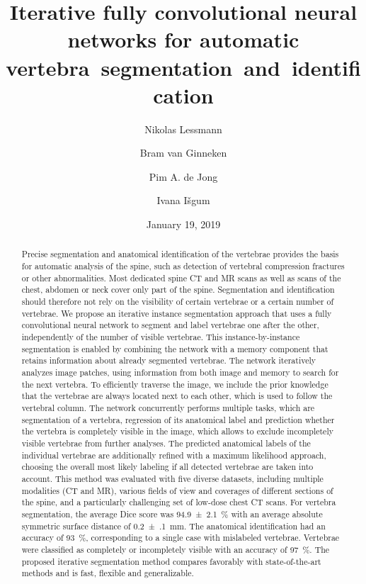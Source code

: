 \documentclass[authoryear,5p,final,times]{elsarticle}
\date{January 19, 2019}
\begin{document}
    \begin{frontmatter}
        \title{Iterative fully convolutional neural networks for automatic vertebra~segmentation~and~identification}

        \author[isi]{Nikolas Lessmann}
        \author[diag]{Bram van Ginneken}
        \author[rad,uu]{Pim A. de Jong}
        \author[isi]{Ivana I{\v{s}}gum}
                
        \address[isi]{Image Sciences Institute, University Medical Center Utrecht, The~Netherlands}
        \address[diag]{Diagnostic Image Analysis Group, Radboud University Medical Center Nijmegen, The~Netherlands}
        \address[rad]{Department of Radiology, University Medical Center Utrecht, The~Netherlands}
        \address[uu]{Utrecht University, The~Netherlands}
        
        \begin{abstract}
            Precise segmentation and anatomical identification of the vertebrae provides the basis for automatic analysis of the spine, such as detection of vertebral compression fractures or other abnormalities. Most dedicated spine CT and MR scans as well as scans of the chest, abdomen or neck cover only part of the spine. Segmentation and identification should therefore not rely on the visibility of certain vertebrae or a certain number of vertebrae. We propose an iterative instance segmentation approach that uses a fully convolutional neural network to segment and label vertebrae one after the other, independently of the number of visible vertebrae. This instance-by-instance segmentation is enabled by combining the network with a memory component that retains information about already segmented vertebrae. The network iteratively analyzes image patches, using information from both image and memory to search for the next vertebra. To efficiently traverse the image, we include the prior knowledge that the vertebrae are always located next to each other, which is used to follow the vertebral column. The network concurrently performs multiple tasks, which are segmentation of a vertebra, regression of its anatomical label and prediction whether the vertebra is completely visible in the image, which allows to exclude incompletely visible vertebrae from further analyses. The predicted anatomical labels of the individual vertebrae are additionally refined with a maximum likelihood approach, choosing the overall most likely labeling if all detected vertebrae are taken into account. This method was evaluated with five diverse datasets, including multiple modalities (CT and MR), various fields of view and coverages of different sections of the spine, and a particularly challenging set of low-dose chest CT scans. For vertebra segmentation, the average Dice score was \SI{94.9(21)}{\percent} with an average absolute symmetric surface distance of \SI{0.2(1)}{\milli\meter}. The anatomical identification had an accuracy of \SI{93}{\percent}, corresponding to a single case with mislabeled vertebrae. Vertebrae were classified as completely or incompletely visible with an accuracy of \SI{97}{\percent}. The proposed iterative segmentation method compares favorably with state-of-the-art methods and is fast, flexible and generalizable.

\end{abstract}
\end{frontmatter}
\end{document}
